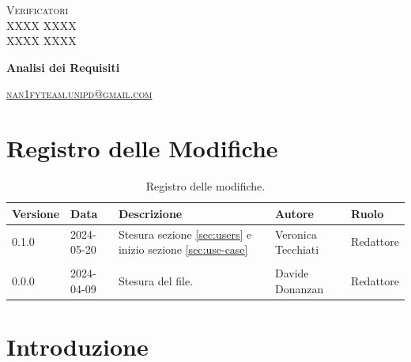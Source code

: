 \documentclass[8pt]{article}
\begin{document}
\begin{titlepage}
\begin{minipage}[t]{0.47\textwidth}
{		}
		\vspace{8mm}
		
		{\large{\textsc{Verificatori}}
			\vspace{3mm}
			{\\\large{\textsc{XXXX XXXX}\\}} 
			{\large{\textsc{XXXX XXXX}}}
			
		}
		\vspace{4mm}\vspace{4mm}
	\end{minipage}
	\vspace{4cm}
	\begin{center}
		\begin{flushright}
			{\fontsize{30pt}{52pt}\selectfont \textbf{Analisi dei Requisiti\\}} %
		\end{flushright}
		\vspace{3cm}
	\end{center}
	\vspace{9.5cm}
	{\small \textsc{\href{mailto: nan1fyteam.unipd@gmail.com}{\color{black}nan1fyteam.unipd@gmail.com}}}
\end{titlepage}
\pagestyle{mystyle}
\section*{Registro delle Modifiche}
\begin{table}[ht!]
\hypersetup{hidelinks}
	\centering
	\begin{tabular}{p{1.2cm} p{2cm} p{6cm} p{3cm} p{2cm}}
		\toprule
		\textbf{Versione}& \textbf{Data} & \textbf{Descrizione} & \textbf{Autore} & \textbf{Ruolo} \\
		\midrule
            0.1.0 & 2024-05-20 & Stesura sezione \ref{sec:users} e inizio sezione \ref{sec:use-case} & Veronica Tecchiati & Redattore \\\\
		0.0.0 & 2024-04-09 & Stesura del file. & Davide Donanzan & Redattore \\
		\bottomrule
	\end{tabular}
	\caption{Registro delle modifiche.}
	\label{table:Registro delle modifiche}
\end{table}
\newpage
{\hypersetup{hidelinks} \tableofcontents}
\clearpage
\newpage
{\hypersetup{hidelinks} \listoffigures}
\newpage
{\hypersetup{hidelinks} \listoftables}
\newpage
\justifying
\section{Introduzione}
\end{document}
